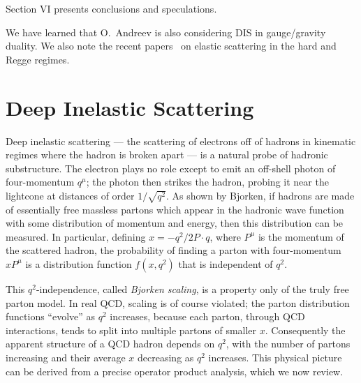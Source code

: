 Section VI presents conclusions and speculations.

We have learned that O.~Andreev is also considering DIS in 
gauge/gravity duality.
We also note the recent papers~\cite{newhard} on elastic scattering in the
hard and Regge regimes.

\section{Deep Inelastic Scattering }


Deep inelastic scattering --- the scattering of electrons
off of hadrons in kinematic regimes where the hadron is
broken apart --- is a natural probe of hadronic substructure.
The electron plays no role except to emit an off-shell
photon of four-momentum $q^\mu$; the photon then strikes
the hadron, probing it near the lightcone at distances
of order $1/\sqrt {q^2}$.
As shown by Bjorken, if hadrons are made of
essentially free massless partons which appear in the hadronic
wave function with some distribution of momentum
and energy, then this distribution can be measured.
In particular, defining $x= -q^2/2P\cdot q$, where
$P^\mu$ is the momentum of the scattered hadron, the
probability of finding a parton with four-momentum $xP^\mu$
is a distribution function $f(x,q^2)$ that is independent of $q^2$.

This $q^2$-independence, called {\it Bjorken scaling}, is a property
only of the truly free parton model.  In real QCD, scaling is of
course violated; the parton distribution functions ``evolve'' as
$q^2$ increases, because each parton, through QCD interactions,
tends to split into multiple partons of smaller $x$.
Consequently the apparent structure of a QCD hadron depends on $q^2$,
with the number of partons increasing and their average $x$
decreasing as $q^2$ increases.  This physical picture can be derived from
a precise operator product analysis, which we now review.




